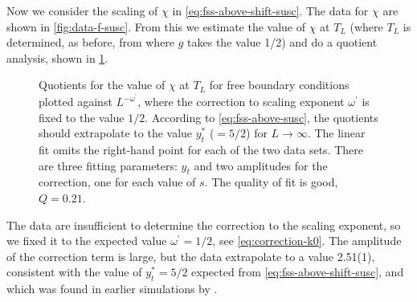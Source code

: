 Now we consider the scaling of $\chi$ in \cref{eq:fss-above-shift-susc}. The
data for $\chi$ are shown in \cref{fig:data-f-susc}. From this we estimate the
value of $\chi$ at $T_L$ (where $T_L$ is determined, as before, from where $g$
takes the value 1/2) and do a quotient analysis, shown in \cref{fig:qchiTL}.
\begin{figure}
  \centering
  
  \caption[
    Quotients for the value of the susceptibility $\chi$ at the finite-size
    pseudocritical temperature for the five-dimensional Ising model with free
    boundary conditions.
  ]
  {
    Quotients for the value of $\chi$ at $T_L$ for free boundary conditions
    plotted against $L^{-\omega^{\prime}}$, where the correction to scaling
    exponent $\omega^{\prime}$ is fixed to the value $1/2$. According to
    \cref{eq:fss-above-susc}, the quotients should extrapolate to the value
    $y_t^*$ ($=5/2$) for $L\to\infty$. The linear fit omits the right-hand
    point for each of the two data sets. There are three fitting parameters:
    $y_t$ and two amplitudes for the correction, one for each value of $s$. The
    quality of fit is good, $Q=0.21$.
  }
  \label{fig:qchiTL}
\end{figure}
The data are insufficient to determine the correction to the scaling exponent,
so we fixed it to the expected value $\omega^{\prime}=1/2$, see
\cref{eq:correction-k0}. The amplitude of the correction term is large, but the
data extrapolate to a value 2.51(1),
consistent with the value of $y_t^*=5/2$ expected from
\cref{eq:fss-above-shift-susc}, and which was found in earlier simulations by
\textcite{berche2012hyperscaling,kenna2013new}.

